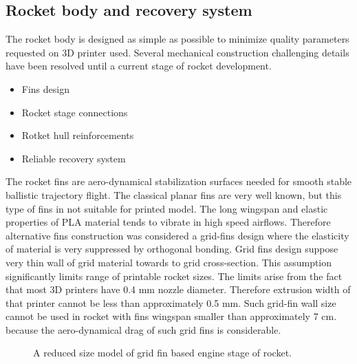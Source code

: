 \documentclass{poster16}
\begin{document}
\subsection{Rocket body and recovery system}

The rocket body is designed as simple as possible to minimize quality parameters requested on 3D printer used. Several mechanical construction challenging details have been resolved until a current stage of rocket development. 

\begin{itemize}
\item Fins design
\item Rocket stage connections
\item Rotket hull reinforcements
\item Reliable recovery system
\end{itemize}

The rocket fins are aero-dynamical stabilization surfaces needed for smooth stable ballistic trajectory flight.  The classical planar fins are very well known, but this type of fins in not suitable for printed model.  The long wingspan and elastic properties of PLA material tends to vibrate in high speed airflows.
Therefore alternative fins construction was considered a grid-fins design \cite{grid_fins} where the elasticity of material is very suppressed by orthogonal bonding.
Grid fins design suppose very thin wall of grid material towards to grid cross-section. This assumption significantly limits range of printable rocket sizes. The limits arise from the fact that most 3D printers have 0.4 mm nozzle diameter. Therefore extrusion width of that printer cannot be less than approximately 0.5 mm. Such grid-fin wall size cannot be used in rocket with fins wingspan smaller than approximately 7 cm. because the aero-dynamical drag of such grid fins is considerable. 

\begin{figure}[ht]
\begin{center}
\caption{A reduced size model of grid fin based engine stage of rocket. } 
\label{fig:printed_parts}
\end{center}
\end{figure}
\end{document}
